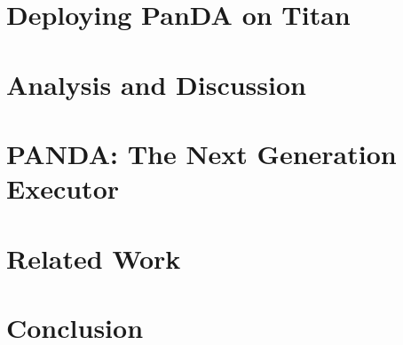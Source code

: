 \documentclass[conference]{IEEEtran}
\begin{document}
\section{Deploying PanDA on Titan}
\label{sec:panda_titan}



\section{Analysis and Discussion}
\label{sec:panda_titan}



\section{PANDA\@: The Next Generation Executor}
\label{sec:panda_roadmap}




\section{Related Work}
\label{sec:related}



\section{Conclusion}
\label{sec:conclusion}

\end{document}
